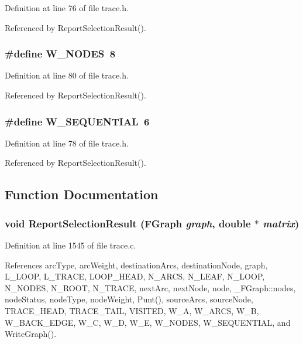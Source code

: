 Definition at line 76 of file trace.h.

Referenced by Report\-Selection\-Result().
\subsubsection{\setlength{\rightskip}{0pt plus 5cm}\#define W\_\-NODES~8}\label{trace_8h_7dfeace4882c762dc5aa76371999ca86}




Definition at line 80 of file trace.h.

Referenced by Report\-Selection\-Result().
\subsubsection{\setlength{\rightskip}{0pt plus 5cm}\#define W\_\-SEQUENTIAL~6}\label{trace_8h_f5a2f9a7eb2d00c7d434f9b3442bb852}




Definition at line 78 of file trace.h.

Referenced by Report\-Selection\-Result().

\subsection{Function Documentation}
\subsubsection{\setlength{\rightskip}{0pt plus 5cm}void Report\-Selection\-Result (\bf{FGraph} {\em graph}, double $\ast$ {\em matrix})}\label{trace_8h_e4fae04de077835aca2c8f6c383f0404}




Definition at line 1545 of file trace.c.

References arc\-Type, arc\-Weight, destination\-Arcs, destination\-Node, graph, L\_\-LOOP, L\_\-TRACE, LOOP\_\-HEAD, N\_\-ARCS, N\_\-LEAF, N\_\-LOOP, N\_\-NODES, N\_\-ROOT, N\_\-TRACE, next\-Arc, next\-Node, node, \_\-FGraph::nodes, node\-Status, node\-Type, node\-Weight, Punt(), source\-Arcs, source\-Node, TRACE\_\-HEAD, TRACE\_\-TAIL, VISITED, W\_\-A, W\_\-ARCS, W\_\-B, W\_\-BACK\_\-EDGE, W\_\-C, W\_\-D, W\_\-E, W\_\-NODES, W\_\-SEQUENTIAL, and Write\-Graph().
